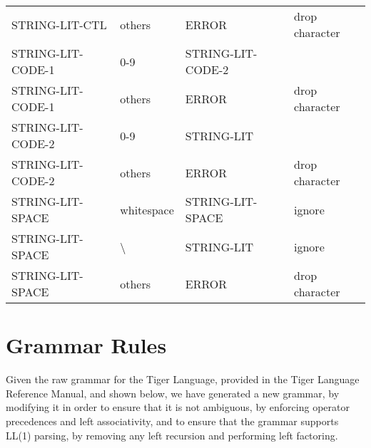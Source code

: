 \documentclass[11pt, fleqn]{article}
\begin{document}
\begin{longtable}{l|l|l|l}
STRING-LIT-CTL		&	others					&	ERROR				& drop character					\\
STRING-LIT-CODE-1	&	0-9						&	STRING-LIT-CODE-2			&					\\
STRING-LIT-CODE-1	&	others					&	ERROR			&	drop character				\\
STRING-LIT-CODE-2	&	0-9						&	STRING-LIT		&								\\
STRING-LIT-CODE-2	&	others					&	ERROR			&	drop character				\\
STRING-LIT-SPACE		&	whitespace				&	STRING-LIT-SPACE		& ignore							\\
STRING-LIT-SPACE		&	\textbackslash			&	STRING-LIT			& ignore							\\
STRING-LIT-SPACE		&	others					&	ERROR				& drop character				\\
\end{longtable}

\section{Grammar Rules}

Given the raw grammar for the Tiger Language, provided in the Tiger Language Reference Manual, and shown below, we have generated a new grammar, by modifying it in order to ensure that it is not ambiguous, by enforcing operator precedences and left associativity, and to ensure that the grammar supports LL(1) parsing, by removing any left recursion and performing left factoring.
\end{document}

